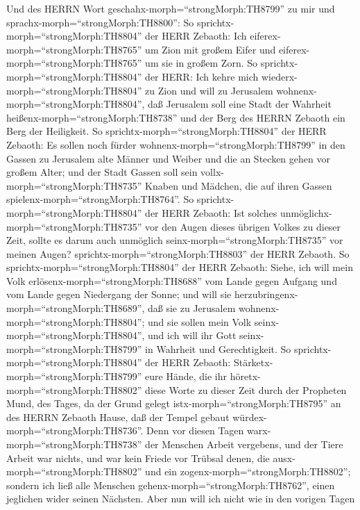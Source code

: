  Und des HERRN Wort geschahx-morph=``strongMorph:TH8799'' zu
mir und sprachx-morph=``strongMorph:TH8800'':  So
sprichtx-morph=``strongMorph:TH8804'' der HERR Zebaoth: Ich
eiferex-morph=``strongMorph:TH8765'' um Zion mit großem Eifer und
eiferex-morph=``strongMorph:TH8765'' um sie in großem Zorn. 
So sprichtx-morph=``strongMorph:TH8804'' der HERR: Ich kehre mich
wiederx-morph=``strongMorph:TH8804'' zu Zion und will zu Jerusalem
wohnenx-morph=``strongMorph:TH8804'', daß Jerusalem soll eine Stadt der
Wahrheit heißenx-morph=``strongMorph:TH8738'' und der Berg des HERRN
Zebaoth ein Berg der Heiligkeit.  So
sprichtx-morph=``strongMorph:TH8804'' der HERR Zebaoth: Es sollen noch
fürder wohnenx-morph=``strongMorph:TH8799'' in den Gassen zu Jerusalem
alte Männer und Weiber und die an Stecken gehen vor großem Alter;
 und der Stadt Gassen soll sein
vollx-morph=``strongMorph:TH8735'' Knaben und Mädchen, die auf ihren
Gassen spielenx-morph=``strongMorph:TH8764''.  So
sprichtx-morph=``strongMorph:TH8804'' der HERR Zebaoth: Ist solches
unmöglichx-morph=``strongMorph:TH8735'' vor den Augen dieses übrigen
Volkes zu dieser Zeit, sollte es darum auch unmöglich
seinx-morph=``strongMorph:TH8735'' vor meinen Augen?
sprichtx-morph=``strongMorph:TH8803'' der HERR Zebaoth.  So
sprichtx-morph=``strongMorph:TH8804'' der HERR Zebaoth: Siehe, ich will
mein Volk erlösenx-morph=``strongMorph:TH8688'' vom Lande gegen Aufgang
und vom Lande gegen Niedergang der Sonne;  und will sie
herzubringenx-morph=``strongMorph:TH8689'', daß sie zu Jerusalem
wohnenx-morph=``strongMorph:TH8804''; und sie sollen mein Volk
seinx-morph=``strongMorph:TH8804'', und ich will ihr Gott
seinx-morph=``strongMorph:TH8799'' in Wahrheit und Gerechtigkeit.
 So sprichtx-morph=``strongMorph:TH8804'' der HERR Zebaoth:
Stärketx-morph=``strongMorph:TH8799'' eure Hände, die ihr
höretx-morph=``strongMorph:TH8802'' diese Worte zu dieser Zeit durch der
Propheten Mund, des Tages, da der Grund gelegt
istx-morph=``strongMorph:TH8795'' an des HERRN Zebaoth Hause, daß der
Tempel gebaut würdex-morph=``strongMorph:TH8736''.  Denn
vor diesen Tagen warx-morph=``strongMorph:TH8738'' der Menschen Arbeit
vergebens, und der Tiere Arbeit war nichts, und war kein Friede vor
Trübsal denen, die ausx-morph=``strongMorph:TH8802'' und ein
zogenx-morph=``strongMorph:TH8802''; sondern ich ließ alle Menschen
gehenx-morph=``strongMorph:TH8762'', einen jeglichen wider seinen
Nächsten.  Aber nun will ich nicht wie in den vorigen Tagen
